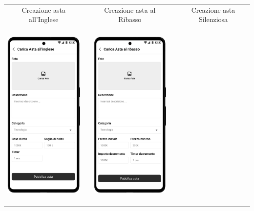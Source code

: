 \begin{center}
	\begin{tabular}{ccccc}
		Creazione asta all'Inglese                                                         &  &
		Creazione asta al Ribasso                                                          &  &
		Creazione asta Silenziosa                                                               \\
		\includegraphics[height=270pt]{assets/mockup/Carica Asta 1.1 Asta all'Inglese.png} &  &
		\includegraphics[height=270pt]{assets/mockup/Carica Asta 1.1 Asta al Ribasso.png}  &  &

\end{tabular}
\end{center}
